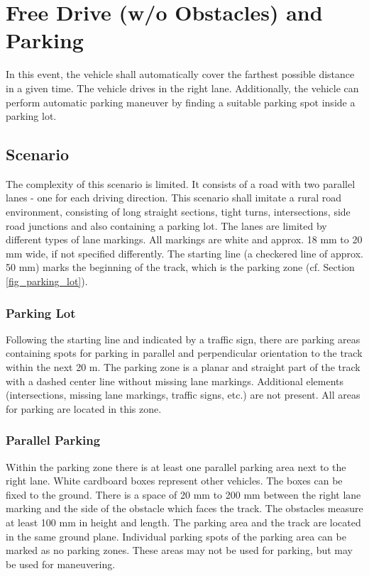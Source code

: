 \documentclass[a4paper]{report}
\begin{document}
\section{Free Drive (w/o Obstacles) and Parking}

In this event, the vehicle shall automatically cover the farthest possible distance in a given time. The vehicle drives in the right lane. Additionally, the vehicle can perform automatic parking maneuver by finding a suitable parking spot inside a parking lot. 

\subsection{Scenario}

The complexity of this scenario is limited. It consists of a road with two parallel lanes - one for each driving direction. This scenario shall imitate a rural road environment, consisting of long straight sections, tight turns, intersections, side road junctions and also containing a parking lot. The lanes are limited by different types of lane markings. All markings are white and approx. 18 mm to 20 mm wide, if not specified differently. The starting line (a checkered line of approx. 50 mm) marks the beginning of the track, which is the parking zone (cf. Section \ref{fig_parking_lot}). 

\subsubsection{Parking Lot}

Following the starting line and indicated by a traffic sign, there are parking areas containing spots for parking in parallel and perpendicular orientation to the track within the next 20 m. The parking zone is a planar and straight part of the track with a dashed center line without missing lane markings. Additional elements (intersections, missing lane markings, traffic signs, etc.) are not present. All areas for parking are located in this zone. 

\subsubsection{Parallel Parking}

Within the parking zone there is at least one parallel parking area next to the right lane. White cardboard boxes represent other vehicles. The boxes can be fixed to the ground. There is a space of 20 mm to 200 mm between the right lane marking and the side of the obstacle which faces the track. The obstacles measure at least 100 mm in height and length. The parking area and the track are located in the same ground plane. Individual parking spots of the parking area can be marked as no parking zones. These areas may not be used for parking, but may be used for maneuvering. 
\end{document}
